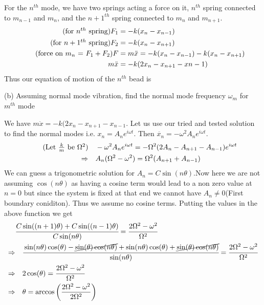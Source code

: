 \documentclass[addpoints]{exam}
\begin{document}
\begin{questions}
\begin{solution}
    For the $n^{th}$ mode, we have two springs acting a force on it, $n^{th}$ spring connected to $m_{n-1}$ and $m_n$, and the $n+1^{th}$ spring connected to $m_n$ and $m_{n+1}$.
    \begin{align*}
        \tag{for $n^{th}$ spring}
        F_1 &= -k(x_n-x_{n-1})\\
        \tag{for $n+1^{th}$ spring}
        F_2 &= -k(x_n-x_{n+1})\\ 
        \tag{force on $m_n$ = $F_1+F_2$}
        F &= m\ddot{x} = -k(x_n-x_{n-1})-k(x_n-x_{n+1})\\ 
        m\ddot{x} &= -k(2x_n-x_{n+1}-x{n-1})
    \end{align*}
    Thus our equation of motion of the $n^{th}$ bead is 
\end{solution}
(b) Assuming normal mode vibration, find the normal mode frequency $\omega_m$ for $m^{th}$ mode
\begin{solution}
    We have $m\ddot{x} = -k(2x_n-x_{n+1}-x_{n-1}.$ Let us use our tried and tested solution to find the normal modes i.e. $x_n = A_ne^{i\omega t}$. Then $\ddot{x_n} = -\omega^2A_ne^{i\omega t}$.
    \begin{align*}
        \tag{Let $\frac{k}{m}$ be $\Omega^2$}
        & \quad -\omega^2A_ne^{i\omega t} = -\Omega^2(2A_n-A_{n+1}-A_{n-1})e^{i\omega t} \\ 
        \Rightarrow& \quad A_n(\Omega^2-\omega^2) = \Omega^2(A_{n+1}+A_{n-1}) \\ 
    \end{align*}
    We can guess a trigonometric solution for $A_n = C\sin(n\theta)$.Now here we are not assuming 
    $\cos(n\theta)$ as having a cosine term would lead to a non zero value at $n=0$ but since
    the system is fixed at that end we cannot have $A_n \neq 0$(First boundary coniditon). Thus we assume no cosine terms.
    Putting the values in the above function we
    get 
    \begin{align*}
        &\cfrac{C\sin((n+1)\theta)+C\sin((n-1)\theta)}{C\sin(n\theta)} = \cfrac{2\Omega^2-\omega^2}{\Omega^2}\\
        \Rightarrow&\quad \cfrac{\sin(n\theta)\cos(\theta) - \cancel{\sin(\theta)\cos(n\theta)} +\sin(n\theta)\cos(\theta) + \cancel{\sin(\theta)\cos(n\theta)}}{\sin(n\theta)} = \cfrac{2\Omega^2-\omega^2}{\Omega^2}\\
        \Rightarrow&\quad 2\cos(\theta) = \cfrac{2\Omega^2-\omega^2}{\Omega^2}\\
        \Rightarrow& \quad \theta = \arccos\left(\frac{2\Omega^2-\omega^2}{2\Omega^2}\right)\\ 

\end{align*}
\end{solution}
\end{questions}
\end{document}

